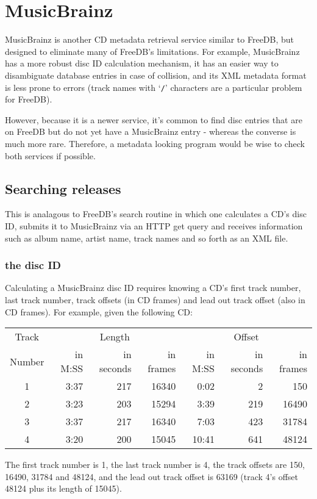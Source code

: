 
\chapter{MusicBrainz}
MusicBrainz is another CD metadata retrieval service similar to FreeDB,
but designed to eliminate many of FreeDB's limitations.
For example, MusicBrainz has a more robust disc ID calculation mechanism,
it has an easier way to disambiguate database entries in case of collision,
and its XML metadata format is less prone to errors
(track names with `\texttt{/}' characters are a particular problem for
FreeDB).

However, because it is a newer service, it's common to find disc entries
that are on FreeDB but do not yet have a MusicBrainz entry - whereas
the converse is much more rare.
Therefore, a metadata looking program would be wise to check both
services if possible.

\section{Searching releases}
This is analagous to FreeDB's search routine in which one calculates
a CD's disc ID, submits it to MusicBrainz via an HTTP get query
and receives information such as album name, artist name, track names
and so forth as an XML file.

\pagebreak

\subsection{the disc ID}
Calculating a MusicBrainz disc ID requires knowing a CD's first track number,
last track number, track offsets (in CD frames) and lead out track offset
(also in CD frames).
For example, given the following CD:
\begin{table}[h]
\begin{tabular}{|c||r|r|r||r|r|r|}
\hline
Track & \multicolumn{3}{c||}{Length} & \multicolumn{3}{c|}{Offset} \\
Number & in M:SS & in seconds & in frames & in M:SS & in seconds & in frames \\
\hline
1 & 3:37 & 217 & 16340 & 0:02 & 2 & 150 \\
2 & 3:23 & 203 & 15294 & 3:39 & 219 & 16490 \\
3 & 3:37 & 217 & 16340 & 7:03 & 423 & 31784 \\
4 & 3:20 & 200 & 15045 & 10:41 & 641 & 48124 \\
\hline
\end{tabular}
\end{table}
\par
\noindent
The first track number is 1, the last track number is 4, the track offsets
are 150, 16490, 31784 and 48124, and the lead out track offset is
63169 (track 4's offset 48124 plus its length of 15045).

